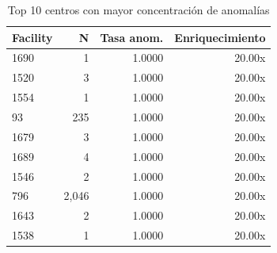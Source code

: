 \begin{table}[htbp]
\centering
\small
\caption{Top 10 centros con mayor concentración de anomalías}
\label{tab:posthoc-facility}
\begin{tabular}{lrrr}
\toprule
Facility & N & Tasa anom. & Enriquecimiento \\
\midrule
  1690 & 1 & 1.0000 & 20.00x \\
  1520 & 3 & 1.0000 & 20.00x \\
  1554 & 1 & 1.0000 & 20.00x \\
  93 & 235 & 1.0000 & 20.00x \\
  1679 & 3 & 1.0000 & 20.00x \\
  1689 & 4 & 1.0000 & 20.00x \\
  1546 & 2 & 1.0000 & 20.00x \\
  796 & 2,046 & 1.0000 & 20.00x \\
  1643 & 2 & 1.0000 & 20.00x \\
  1538 & 1 & 1.0000 & 20.00x \\
\bottomrule
\end{tabular}
\end{table}
